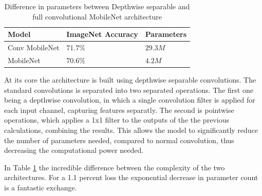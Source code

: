 \begin{table}[htbp]
\begin{center}
\begin{tabular}
{|p{120pt}|p{120pt}|p{120pt}|}
\hline
Model & ImageNet Accuracy & Parameters\\
\hline 
\hline Conv MobileNet & $71.7\%$ & $29.3M$ \\
\hline MobileNet & $70.6\%$ & $4.2M$ \\
\hline
\end{tabular}
\end{center}
\caption{Difference in parameters between Depthwise separable and full convolutional MobileNet architecture \cite{howard2017mobilenets}}
\label{MobileNetTable}
\end{table}

\par At its core the architecture is built using depthwise separable convolutions. The standard convolutions is separated into two separated operations. The first one being a depthwise convolution, in which a single convolution filter is applied for each input channel, capturing features separatly. The second is pointwise operations, which applies a 1x1 filter to the outputs of the the previous calculations, combining the results. This allows the model to significantly reduce the number of parameters needed, compared to normal convolution, thus decreasing the computational power needed. \cite{howard2017mobilenets}
\par In Table \ref{MobileNetTable} the incredible difference between the complexity of the two architectures. For a 1.1 percent loss the exponential decrease in parameter count is a fantastic exchange.



